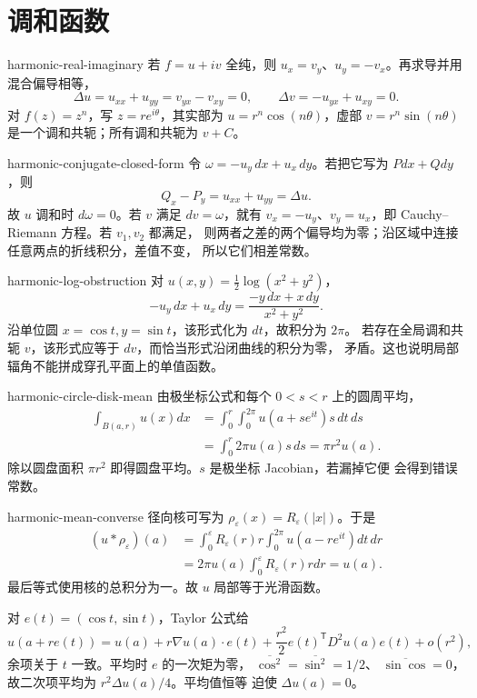 \chapter{调和函数}

\begin{solution}{harmonic-real-imaginary}
若 $f=u+iv$ 全纯，则 $u_x=v_y$、$u_y=-v_x$。再求导并用混合偏导相等，
\[
 \Delta u=u_{xx}+u_{yy}=v_{yx}-v_{xy}=0,
 \qquad
 \Delta v=-u_{yx}+u_{xy}=0.
\]
对 $f(z)=z^n$，写 $z=re^{i\theta}$，其实部为
$u=r^n\cos(n\theta)$，虚部
$v=r^n\sin(n\theta)$ 是一个调和共轭；所有调和共轭为 $v+C$。
\end{solution}

\begin{solution}{harmonic-conjugate-closed-form}
令 $\omega=-u_y\,dx+u_x\,dy$。若把它写为 $Pdx+Qdy$，则
\[
 Q_x-P_y=u_{xx}+u_{yy}=\Delta u.
\]
故 $u$ 调和时 $d\omega=0$。若 $v$ 满足 $dv=\omega$，就有
$v_x=-u_y$、$v_y=u_x$，即 Cauchy--Riemann 方程。若 $v_1,v_2$ 都满足，
则两者之差的两个偏导均为零；沿区域中连接任意两点的折线积分，差值不变，
所以它们相差常数。
\end{solution}

\begin{solution}{harmonic-log-obstruction}
对 $u(x,y)=\tfrac12\log(x^2+y^2)$，
\[
 -u_y\,dx+u_x\,dy
 =\frac{-y\,dx+x\,dy}{x^2+y^2}.
\]
沿单位圆 $x=\cos t,y=\sin t$，该形式化为 $dt$，故积分为 $2\pi$。
若存在全局调和共轭 $v$，该形式应等于 $dv$，而恰当形式沿闭曲线的积分为零，
矛盾。这也说明局部辐角不能拼成穿孔平面上的单值函数。
\end{solution}

\begin{solution}{harmonic-circle-disk-mean}
由极坐标公式和每个 $0<s<r$ 上的圆周平均，
\begin{align*}
 \int_{B(a,r)}u(x)dx
 &=\int_0^r\int_0^{2\pi}u(a+se^{it})s\,dt\,ds\\
 &=\int_0^r2\pi u(a)s\,ds
 =\pi r^2u(a).
\end{align*}
除以圆盘面积 $\pi r^2$ 即得圆盘平均。$s$ 是极坐标 Jacobian，若漏掉它便
会得到错误常数。
\end{solution}

\begin{solution}{harmonic-mean-converse}
径向核可写为 $\rho_\varepsilon(x)=R_\varepsilon(|x|)$。于是
\begin{align*}
 (u*\rho_\varepsilon)(a)
 &=\int_0^\varepsilon R_\varepsilon(r)r
 \int_0^{2\pi}u(a-re^{it})dt\,dr\\
 &=2\pi u(a)\int_0^\varepsilon R_\varepsilon(r)rdr=u(a).
\end{align*}
最后等式使用核的总积分为一。故 $u$ 局部等于光滑函数。

对 $e(t)=(\cos t,\sin t)$，Taylor 公式给
\[
 u(a+re(t))=u(a)+r\nabla u(a)\cdot e(t)
 +\frac{r^2}{2}e(t)^{\mathsf T}D^2u(a)e(t)+o(r^2),
\]
余项关于 $t$ 一致。平均时 $e$ 的一次矩为零，
$\overline{\cos^2}=\overline{\sin^2}=1/2$、
$\overline{\sin\cos}=0$，故二次项平均为 $r^2\Delta u(a)/4$。平均值恒等
迫使 $\Delta u(a)=0$。
\end{solution}

